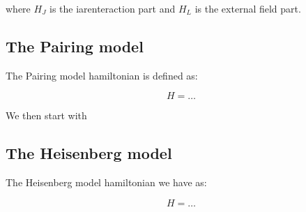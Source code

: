 where $H_J$ is the iarenteraction part and $H_L$ is the external field part.

\subsection{The Pairing model}

The Pairing model hamiltonian is defined as:

\begin{equation}
  H = \dots
  \label{eq:Pairing_model_imp}
\end{equation}

We then start with

\subsection{The Heisenberg model}

The Heisenberg model hamiltonian we have as:

\begin{equation}
  H = \dots
  \label{eq:Heisenberg_model_imp}
\end{equation}


